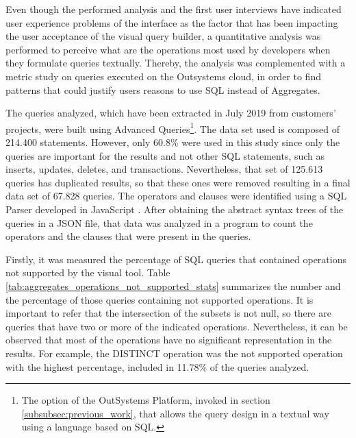 Even though the performed analysis and the first user interviews have indicated user experience problems of the interface as the factor that has been impacting the user acceptance of the visual query builder, a quantitative analysis was performed to perceive what are the operations most used by developers when they formulate queries textually. Thereby, the analysis was complemented with a metric study on queries executed on the Outsystems cloud, in order to find patterns that could justify users reasons to use \gls{SQL} instead of Aggregates. 

The queries analyzed, which have been extracted in July 2019 from customers’ projects, were built using Advanced Queries\footnote{The option of the OutSystems Platform, invoked in section \ref{subsubsec:previous_work}, that allows the query design in a textual way using a language based on \gls{SQL}.}. The data set used is composed of 214.400 statements. However, only 60.8\% were used in this study since only the queries are important for the results and not other SQL statements, such as inserts, updates, deletes, and transactions. Nevertheless, that set of 125.613 queries has duplicated results, so that these ones were removed resulting in a final data set of 67.828 queries. The operators and clauses were identified using a \gls{SQL} Parser developed in JavaScript \cite{jsSqlParser}. After obtaining the abstract syntax trees of the queries in a JSON file, that data was analyzed in a program to count the operators and the clauses that were present in the queries. 

Firstly, it was measured the percentage of \gls{SQL} queries that contained operations not supported by the visual tool. Table \ref{tab:aggregates_operations_not_supported_stats} summarizes the number and the percentage of those queries containing not supported operations. It is important to refer that the intersection of the subsets is not null, so there are queries that have two or more of the indicated operations. Nevertheless, it can be observed that most of the operations have no significant representation in the results. For example, the DISTINCT operation was the not supported operation with the highest percentage, included in 11.78\% of the queries analyzed.


